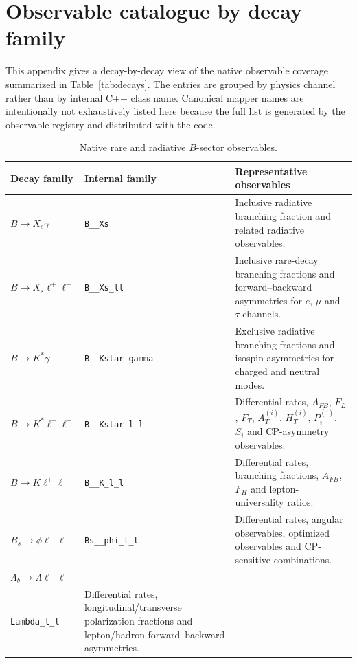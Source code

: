 \documentclass[preprint,11pt]{elsarticle}
\begin{document}
\appendix

\section{Observable catalogue by decay family}\label{app:observable_catalogue}

This appendix gives a decay-by-decay view of the native observable coverage summarized in Table~\ref{tab:decays}.  The entries are grouped by physics channel rather than by internal C++ class name.  Canonical mapper names are intentionally not exhaustively listed here because the full list is generated by the observable registry and distributed with the code.

\begin{table}[!ht]
\centering
\footnotesize
\renewcommand{\arraystretch}{1.15}
\begin{tabularx}{\textwidth}{@{}p{}p{}X@{}}
\toprule
\textbf{Decay family} & \textbf{Internal family} & \textbf{Representative observables} \\
\midrule
$B\to X_s\gamma$ & \texttt{B\_\_Xs} &
Inclusive radiative branching fraction and related radiative observables. \\
$B\to X_s\ell^+\ell^-$ & \texttt{B\_\_Xs\_ll} &
Inclusive rare-decay branching fractions and forward--backward asymmetries for $e$, $\mu$ and $\tau$ channels. \\
$B\to K^*\gamma$ & \texttt{B\_\_Kstar\_gamma} &
Exclusive radiative branching fractions and isospin asymmetries for charged and neutral modes. \\
$B\to K^*\ell^+\ell^-$ & \texttt{B\_\_Kstar\_l\_l} &
Differential rates, $A_{FB}$, $F_L$, $F_T$, $A_T^{(i)}$, $H_T^{(i)}$, $P_i^{(\prime)}$, $S_i$ and CP-asymmetry observables. \\
$B\to K\ell^+\ell^-$ & \texttt{B\_\_K\_l\_l} &
Differential rates, branching fractions, $A_{FB}$, $F_H$ and lepton-universality ratios. \\
$B_s\to\phi\ell^+\ell^-$ & \texttt{Bs\_\_phi\_l\_l} &
Differential rates, angular observables, optimized observables and CP-sensitive combinations. \\
$\Lambda_b\to\Lambda\ell^+\ell^-$ & \shortstack[l]{\texttt{Lambda\_b\_\_}\\\texttt{Lambda\_l\_l}} &
Differential rates, longitudinal/transverse polarization fractions and lepton/hadron forward--backward asymmetries. \\
\bottomrule
\end{tabularx}
\caption{Native rare and radiative $B$-sector observables.}
\label{tab:observable_catalogue_b_rare}
\end{table}
\end{document}
